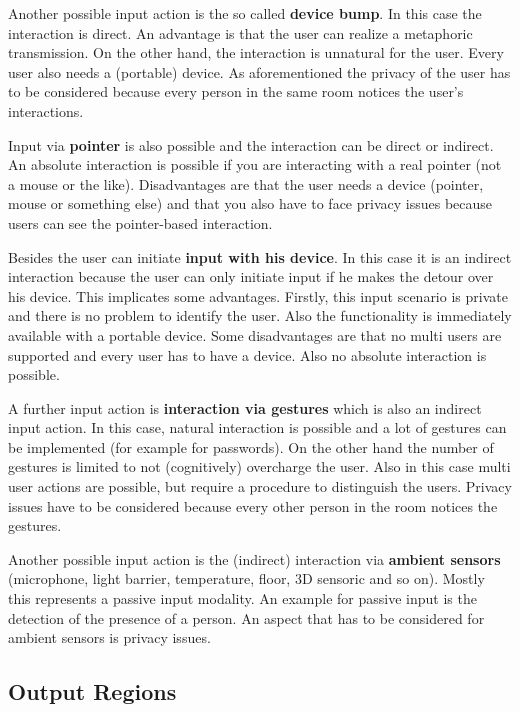 Another possible input action is the so called \textbf{device bump}.
In this case the interaction is direct.
An advantage is that the user can realize a metaphoric transmission.
On the other hand, the interaction is unnatural for the user.
Every user also needs a (portable) device.
As aforementioned the privacy of the user has to be considered because every person in the same room notices the user’s interactions. 

Input via \textbf{pointer} is also possible and the interaction can be direct or indirect.
An absolute interaction is possible if you are interacting with a real pointer (not a mouse or the like).
Disadvantages are that the user needs a device (pointer, mouse or something else) and that you also have to face privacy issues because users can see the pointer-based interaction.

Besides the user can initiate \textbf{input with his device}.
In this case it is an indirect interaction because the user can only initiate input if he makes the detour over his device. This implicates some advantages.
Firstly, this input scenario is private and there is no problem to identify the user.
Also the functionality is immediately available with a portable device.
Some disadvantages are that no multi users are supported and every user has to have a device.
Also no absolute interaction is possible.

A further input action is \textbf{interaction via gestures} which is also an indirect input action.
In this case, natural interaction is possible and a lot of gestures can be implemented (for example for passwords).
On the other hand the number of gestures is limited to not (cognitively) overcharge the user.
Also in this case multi user actions are possible, but require a procedure to distinguish the users.
Privacy issues have to be considered because every other person in the room notices the gestures.

Another possible input action is the (indirect) interaction via \textbf{ambient sensors} (microphone, light barrier, temperature, floor, 3D sensoric and so on).
Mostly this represents a passive input modality.
An example for passive input is the detection of the presence of a person.
An aspect that has to be considered for ambient sensors is privacy issues.

\subsection{Output Regions}

